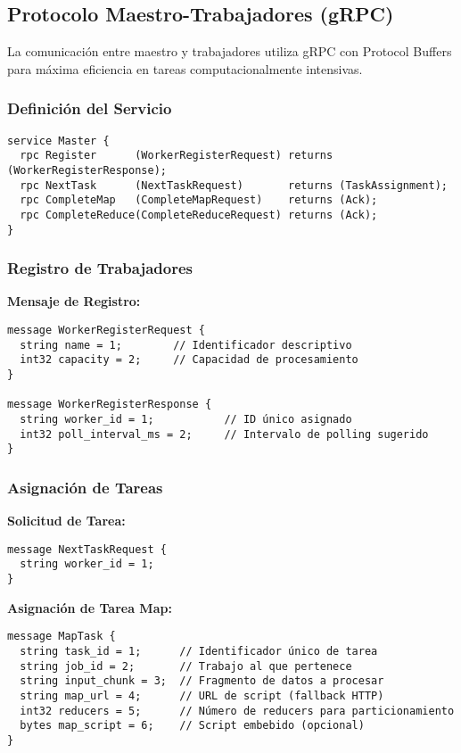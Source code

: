\subsection{Protocolo Maestro-Trabajadores (gRPC)}

La comunicación entre maestro y trabajadores utiliza gRPC con Protocol Buffers para máxima eficiencia en tareas computacionalmente intensivas.

\subsubsection{Definición del Servicio}

\begin{verbatim}
service Master {
  rpc Register      (WorkerRegisterRequest) returns (WorkerRegisterResponse);
  rpc NextTask      (NextTaskRequest)       returns (TaskAssignment);
  rpc CompleteMap   (CompleteMapRequest)    returns (Ack);
  rpc CompleteReduce(CompleteReduceRequest) returns (Ack);
}
\end{verbatim}

\subsubsection{Registro de Trabajadores}

\textbf{Mensaje de Registro:}
\begin{verbatim}
message WorkerRegisterRequest {
  string name = 1;        // Identificador descriptivo
  int32 capacity = 2;     // Capacidad de procesamiento
}

message WorkerRegisterResponse {
  string worker_id = 1;           // ID único asignado
  int32 poll_interval_ms = 2;     // Intervalo de polling sugerido
}
\end{verbatim}

\subsubsection{Asignación de Tareas}

\textbf{Solicitud de Tarea:}
\begin{verbatim}
message NextTaskRequest { 
  string worker_id = 1; 
}
\end{verbatim}

\textbf{Asignación de Tarea Map:}
\begin{verbatim}
message MapTask {
  string task_id = 1;      // Identificador único de tarea
  string job_id = 2;       // Trabajo al que pertenece
  string input_chunk = 3;  // Fragmento de datos a procesar
  string map_url = 4;      // URL de script (fallback HTTP)
  int32 reducers = 5;      // Número de reducers para particionamiento
  bytes map_script = 6;    // Script embebido (opcional)
}
\end{verbatim}

